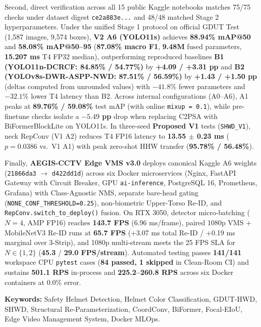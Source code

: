 Second, direct verification across all 15 public Kaggle notebooks matches 75/75 checks under dataset digest \texttt{ce2a883e...} and 48/48 matched Stage 2 hyperparameters. Under the unified Stage 1 protocol on official GDUT Test (1,587 images, 9,574 boxes), \textbf{V2 A6 (YOLO11s)} achieves \textbf{88.94\% mAP@50} and \textbf{58.08\% mAP@50--95} (\textbf{87.08\% macro F1}, \textbf{9.48M} fused parameters, \textbf{15.207 ms} T4 FP32 median), outperforming reproduced baselines \textbf{B1 (YOLO11n-DCRCF: 84.85\% / 54.77\%)} by \textbf{+4.09 / +3.31 pp} and \textbf{B2 (YOLOv8s-DWR-ASPP-NWD: 87.51\% / 56.59\%)} by \textbf{+1.43 / +1.50 pp} (deltas computed from unrounded values) with \textbf{$-41.8\%$} fewer parameters and \textbf{$-32.1\%$} lower T4 latency than B2. Across internal configurations (A0--A6), A1 peaks at \textbf{89.76\% / 59.08\%} test mAP (with online \texttt{mixup = 0.1}), while pre-finetune checks isolate a \textbf{$-5.49$ pp} drop when replacing C2PSA with BiFormerBlockLite on YOLO11s. In three-seed \textbf{Proposed V1} tests (\texttt{SHWD\_V1}), neck RepConv (V1 A2) reduces T4 FP16 latency to \textbf{13.55 $\pm$ 0.23 ms} ($p = 0.0386$ vs.\ V1 A1) with peak zero-shot HHW transfer (\textbf{95.78\% / 56.48\%}).

Finally, \textbf{AEGIS-CCTV Edge VMS v3.0} deploys canonical Kaggle A6 weights (\texttt{21866da3} $\to$ \texttt{d422dd1d}) across six Docker microservices (Nginx, FastAPI Gateway with Circuit Breaker, GPU \texttt{ai-inference}, PostgreSQL 16, Prometheus, Grafana) with Class-Agnostic NMS, separate bare-head gating (\nolinkurl{NONE_CONF_THRESHOLD=0.25}), non-biometric Upper-Torso Re-ID, and \nolinkurl{RepConv.switch_to_deploy()} fusion. On RTX 3050, detector micro-batching ($N=4$, AMP FP16) reaches \textbf{143.7 FPS} (6.96 ms/frame), paired 1080p VMS + MobileNetV3 Re-ID runs at \textbf{65.7 FPS} (+3.07 ms total Re-ID / +0.19 ms marginal over 3-Strip), and 1080p multi-stream meets the 25 FPS SLA for $N \in \{1, 2\}$ (\textbf{45.3} / \textbf{29.0 FPS/stream}). Automated testing passes \textbf{141/141} workspace CPU \texttt{pytest} cases (\textbf{84 passed, 1 skipped} in Clean-Room CI) and sustains \textbf{501.1 RPS} in-process and \textbf{225.2--260.8 RPS} across six Docker containers at 0.0\% error.

\vspace{4pt}
\noindent\textbf{Keywords:} Safety Helmet Detection, Helmet Color Classification, GDUT-HWD, SHWD, Structural Re-Parameterization, CoordConv, BiFormer, Focal-EIoU, Edge Video Management System, Docker MLOps.
\endgroup
